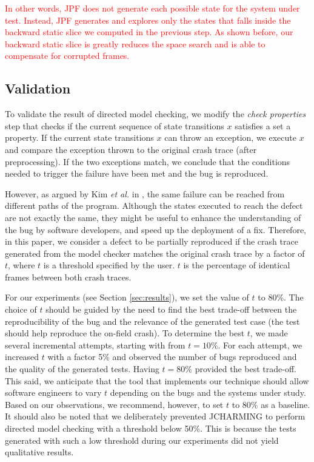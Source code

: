 \documentclass[times]{smrauth}
\newcommand{\red}[1]{\textcolor{red}{#1}}
\begin{document}
\red{In other words, JPF does not generate each possible state for the system under test. 
Instead, JPF generates and explores only the states that falls inside the backward static 
slice we computed in the previous step. As shown before, our backward static slice is 
greatly reduces the space search and is able to compensate for corrupted frames.}

\subsection{Validation}

To validate the result of directed model checking, we modify
the {\it check properties} step that checks if the current sequence
of state transitions $x$ satisfies a set a property. If the current
state transitions $x$ can throw an exception, we execute $x$ and
compare the exception thrown to the original crash trace (after
preprocessing). If the two exceptions match, we conclude that
the conditions needed to trigger the failure have been met and
the bug is reproduced.

However, as argued by Kim {\it et al.} in \cite{Kim2013b}, the same failure can
be reached from different paths of the program. Although the
states executed to reach the defect are not exactly the same,
they might be useful to enhance the understanding of the bug
by software developers, and speed up the deployment of a fix.
Therefore, in this paper, we consider a defect to be partially
reproduced if the crash trace generated from the model
checker matches the original crash trace by a factor of $t$, where
$t$ is a threshold specified by the user. $t$ is the percentage of
identical frames between both crash traces.

For our experiments (see Section \ref{sec:results}), we set the value of $t$ to 80\%.
The choice of $t$ should be guided by the need to find the best trade-off
between the reproducibility of the bug and
the relevance  of the generated test case (the test should help
 reproduce the on-field crash). To determine the best $t$, we made several incremental attempts, starting with from $t = 10\%$.  For each attempt, we increased $t$ with a factor 5\% and
observed the number of bugs reproduced and the quality of the generated tests.
Having $t = 80\%$ provided the best trade-off. This said, we anticipate that the tool that implements
our technique should allow software engineers to vary $t$ depending on the bugs and the systems under study. Based on our observations, we recommend, however, 
to set $t$ to 80\% as a baseline. It should also be noted that we deliberately prevented JCHARMING to perform directed model checking with a threshold below 50\%. This is because the tests generated with such a low threshold during our experiments did not yield qualitative results.
\end{document}
